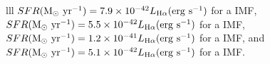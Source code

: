 \documentclass[preprint]{aastex61}
\begin{document}
\begin{deluxetable*}{lll}
{$SFR({\rm M_\odot~ yr^{-1}}) =  7.9\times 10^{-42} L_{\rm H\alpha} ({\rm erg~s^{-1}})$ for a \citet{sal55} IMF,
$SFR({\rm M_\odot~ yr^{-1}}) =  5.5\times 10^{-42} L_{\rm H\alpha} ({\rm erg~s^{-1}})$ for a \citet{kro01} IMF, 
$SFR({\rm M_\odot~ yr^{-1}}) =  1.2\times 10^{-41} L_{\rm H\alpha} ({\rm erg~s^{-1}})$ for a \citet{cha03} IMF, and 
$SFR({\rm M_\odot~ yr^{-1}}) =  5.1\times 10^{-42} L_{\rm H\alpha} ({\rm erg~s^{-1}})$ for a \citet{bal03} IMF.}
\end{deluxetable*}

\clearpage
\end{document}

